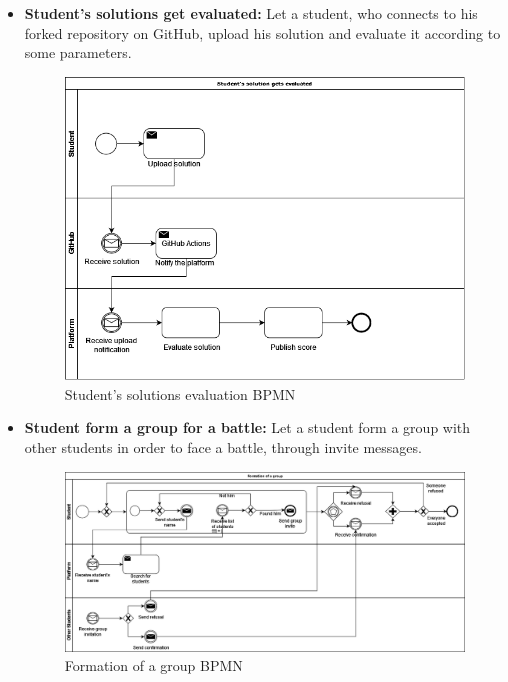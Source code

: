 \documentclass{article}
\begin{document}
{\begin{itemize}
            \item \textbf{Student's solutions get evaluated:} Let a student, who connects to his forked repository on GitHub, upload his solution and evaluate it according to some parameters.
            \begin{figure}[H]
                \centering
                \includegraphics[scale=0.4]{images/BPMN/SolutionEval.png}
                \caption{Student's solutions evaluation BPMN}
                \label{fig:studSolEvalBPMN}
            \end{figure}

            \item \textbf{Student form a group for a battle:} Let a student form a group with other students in order to face a battle, through invite messages.
            \begin{figure}[H]
                \centering
                \hspace*{-1.85cm}\includegraphics[scale=0.4]{images/BPMN/GroupFormation.png}
                \caption{Formation of a group BPMN}
                \label{fig:groupFormationBPMN}
            \end{figure}
        \end{itemize}

}
\end{document}
